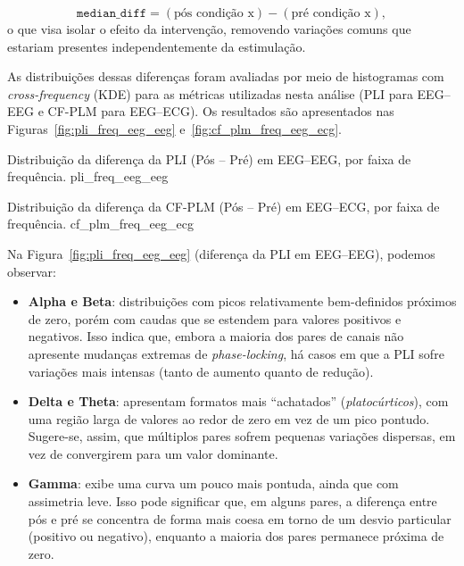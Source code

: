 \[
\texttt{median\_diff} = (\text{pós condição x}) - (\text{pré condição x}),
\]
o que visa isolar o efeito da intervenção, removendo variações comuns que estariam presentes independentemente da estimulação.

As distribuições dessas diferenças foram avaliadas por meio de histogramas com \textit{cross-frequency} (KDE) para as métricas utilizadas nesta análise (PLI para EEG--EEG e CF-PLM para EEG--ECG). Os resultados são apresentados nas Figuras~\ref{fig:pli_freq_eeg_eeg} e~\ref{fig:cf_plm_freq_eeg_ecg}.

{Distribuição da diferença da PLI (Pós -- Pré) em EEG--EEG, por faixa de frequência.}
{pli_freq_eeg_eeg}

{Distribuição da diferença da CF-PLM (Pós -- Pré) em EEG--ECG, por faixa de frequência.}
{cf_plm_freq_eeg_ecg}

Na Figura~\ref{fig:pli_freq_eeg_eeg} (diferença da PLI em EEG--EEG), podemos observar:
\begin{itemize}
    \item \textbf{Alpha e Beta}: distribuições com picos relativamente bem-definidos próximos de zero, porém com caudas que se estendem para valores positivos e negativos. Isso indica que, embora a maioria dos pares de canais não apresente mudanças extremas de \emph{phase-locking}, há casos em que a PLI sofre variações mais intensas (tanto de aumento quanto de redução).
    \item \textbf{Delta e Theta}: apresentam formatos mais “achatados” (\emph{platocúrticos}), com uma região larga de valores ao redor de zero em vez de um pico pontudo. Sugere-se, assim, que múltiplos pares sofrem pequenas variações dispersas, em vez de convergirem para um valor dominante.
    \item \textbf{Gamma}: exibe uma curva um pouco mais pontuda, ainda que com assimetria leve. Isso pode significar que, em alguns pares, a diferença entre pós e pré se concentra de forma mais coesa em torno de um desvio particular (positivo ou negativo), enquanto a maioria dos pares permanece próxima de zero.
\end{itemize}

